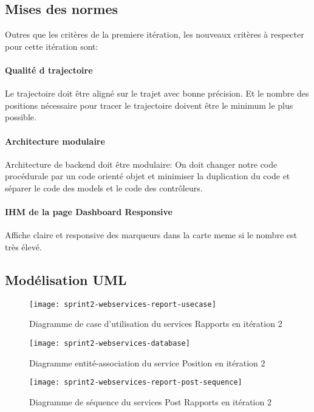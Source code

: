 \subsection{Mises des normes}

Outres que les critères de la premiere itération, les nouveaux critères à
respecter pour cette itération sont:

\paragraph{Qualité d trajectoire}
Le trajectoire doit être aligné sur le trajet avec bonne précision. Et le
nombre des positions nécessaire pour tracer le trajectoire doivent être le
minimum le plus possible.

\paragraph{Architecture modulaire}
Architecture de backend doit être modulaire: On doit changer notre code
procédurale par un code orienté objet et minimiser la duplication du code et
séparer le code des models et le code des contrôleurs.

\paragraph{IHM de la page Dashboard Responsive}
Affiche claire et responsive des marqueurs dans la carte meme si le nombre est
très élevé.

\subsection{Modélisation UML}

\begin{figure}[htbp]
    \centering
    \texttt{[image: sprint2-webservices-report-usecase]}
    \caption{Diagramme de case d'utilisation du services Rapports en itération 2}
\end{figure}

\begin{figure}[htbp]
    \centering
    \texttt{[image: sprint2-webservices-database]}
    \caption{Diagramme entité-association du service Position en itération 2}
\end{figure}

\begin{figure}[htbp]
    \centering
    \texttt{[image: sprint2-webservices-report-post-sequence]}
    \caption{Diagramme de séquence du services Post Rapports en itération 2}
\end{figure}

